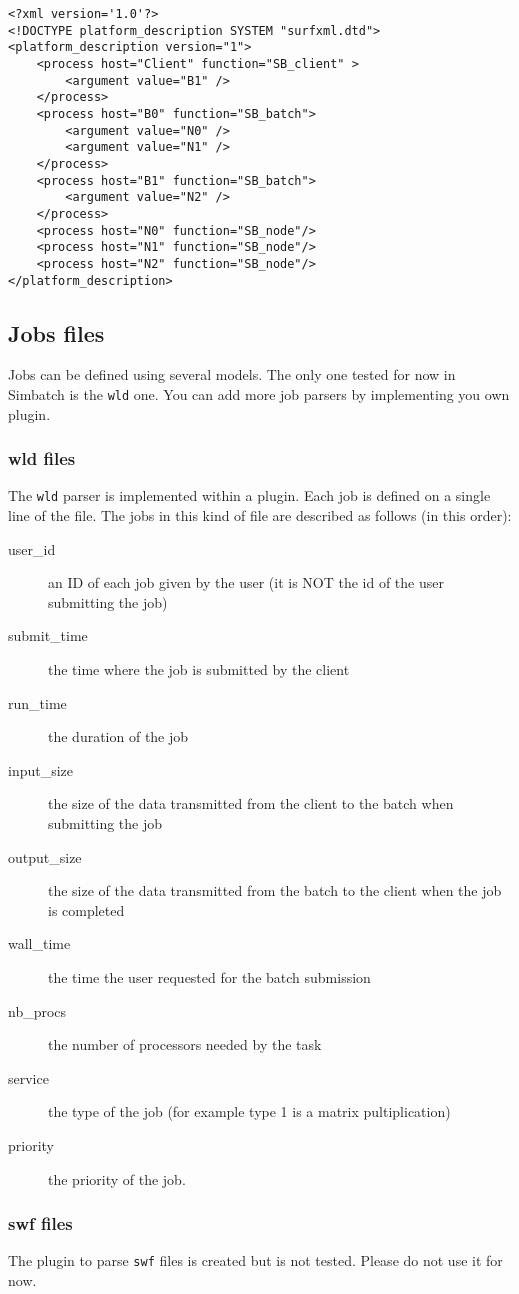 {\small
\begin{verbatim}
<?xml version='1.0'?>
<!DOCTYPE platform_description SYSTEM "surfxml.dtd">
<platform_description version="1">
    <process host="Client" function="SB_client" >
        <argument value="B1" />
    </process>
    <process host="B0" function="SB_batch">
        <argument value="N0" />	
        <argument value="N1" />
    </process> 
    <process host="B1" function="SB_batch">
        <argument value="N2" />	
    </process> 
    <process host="N0" function="SB_node"/>
    <process host="N1" function="SB_node"/>
    <process host="N2" function="SB_node"/>
</platform_description>
\end{verbatim}}


\subsection{Jobs files}
\label{subsec:jobsDESC}

Jobs can be defined using several models. The only one tested for now
in Simbatch is the \verb+wld+ one. You can add more job parsers by
implementing you own plugin.

\subsubsection{wld files}
\label{subsubsec:wld}

The \verb+wld+ parser is implemented within a plugin. Each job is
defined on a single line of the file. The jobs in this kind of file
are described as follows (in this order):

\begin{description}
  \item [user\_id] an ID of each job given by the user (it is NOT the
    id of the user submitting the job)
  \item [submit\_time] the time where the job is submitted by the client
  \item [run\_time] the duration of the job
  \item [input\_size] the size of the data transmitted from the client
    to the batch when submitting the job
  \item [output\_size] the size of the data transmitted from the batch
    to the client when the job is completed
  \item [wall\_time] the time the user requested for the batch submission
  \item [nb\_procs] the number of processors needed by the task
  \item [service] the type of the job (for example type 1 is a matrix
    pultiplication)
  \item [priority] the priority of the job.
\end{description}

\subsubsection{swf files}
\label{subsubsec:swf}

The plugin to parse \verb+swf+ files is created but is not
tested. Please do not use it for now.
